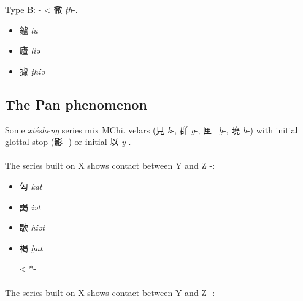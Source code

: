Type B: 
{}- < 徹
 \emph{ṭh}-.

\begin{itemize}
\item
{\Large{鑪}}  \emph{lu }%

\item
{\Large{廬}}  \emph{liə} %

\item
{\Large{攄}}  \emph{ṭhiə} %
\end{itemize}

\subsection{The Pan phenomenon}


Some  \emph{xiéshēng}
series mix MChi. 
velars (見  \emph{k}-, 群
 \emph{g}-, 匣~ \emph{ḫ}-, 曉  \emph{h}-) 
     with initial glottal
stop (影 
    {}-) or initial 以  \emph{y}-. 


\paragraph{}
The series built on X 
shows contact between Y and Z -:

\begin{itemize}\item
{\Large{匃}}  \emph{kat} %

\item
{\Large{謁}}  \emph{    {}iət} %

\item
{\Large{歇}}  \emph{hiət} %

\item
{\Large{褐}} \emph{ḫat} %

\textless{} *{}- %
\end{itemize}




\paragraph{}
The series built on X 
shows contact between Y and Z -:


